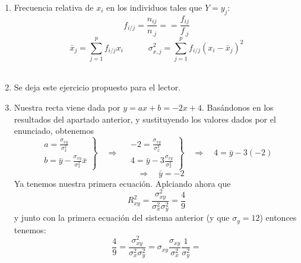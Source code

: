 \documentclass[fleqn]{article}
\def\next{\quad \Rightarrow \quad}
\begin{document}
\begin{enumerate}
                        \begin{enumerate}
                                \item Frecuencia relativa de $x_i$ en los individuos tales que $Y = y_j$:
                                        $$f_{i/j} = \frac{n_{ij}}{n_{.j}} = = \frac{f_{ij}}{f_{.j}}$$ 
                                        $$\bar{x}_j = \sum_{j=1}^p f_{i/j} x_i \quad \quad \quad \sigma_{x,j}^2 = \sum_{j=1}^p f_{i/j}(x_i - \bar{x}_j  )^2$$\\
                                \item Se deja este ejercicio propuesto para el lector.\\
                                \item Nuestra recta viene dada por $y = ax + b = -2x + 4$. Basándonos en los resultados del apartado anterior, y sustituyendo los valores 
                                        dados por el enunciado, obtenemos
                                        $$
                                        \left.
                                        \begin{aligned}
                                                a = \frac{\sigma_{xy}}{\sigma_x^2} \\
                                                b = \bar{y} - \frac{\sigma_{xy}}{\sigma_x^2} \bar{x}
                                        \end{aligned} \right\}
                                        \next \left.
                                        \begin{aligned}
                                                -2 = \frac{\sigma_{xy}}{\sigma_x^2} \\
                                                4 = \bar{y} - 3 \frac{\sigma_{xy}}{\sigma_x^2}
                                        \end{aligned} \right\}
                                        \next 4 = \bar{y} - 3 (-2)  
                                        $$
                                        $$
                                        \next \bar{y} = - 2
                                        $$
                                        Ya tenemos nuestra primera ecuación. Aplciando ahora que 
                                        $$R^2_{xy} = \frac{\sigma_{xy}^2}{\sigma_x^2 \sigma_y^2} = \frac{4}{9}$$
                                        y junto con la primera ecuación del sistema anterior (y que $\sigma_y = 12$) entonces tenemos:
                                        $$\frac{4}{9} = \frac{\sigma_{xy}^2}{\sigma_x^2 \sigma_y^2} = \sigma_{xy}\frac{\sigma_{xy}}{\sigma_x^2} \frac{1}{\sigma_y^2} = 
$$
\end{enumerate}
\end{enumerate}
\end{document}
